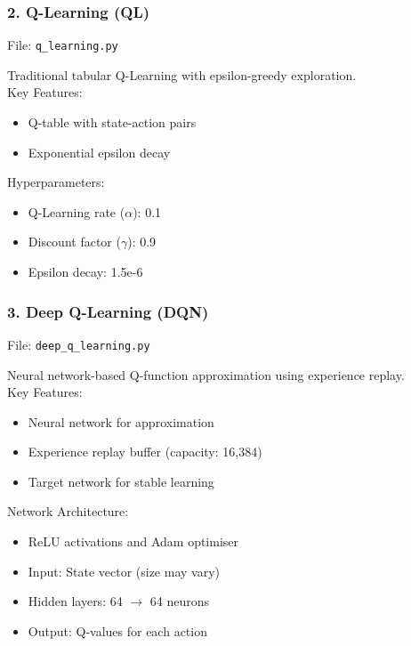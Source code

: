 \documentclass[a4paper]{report}
\begin{document}
\subsubsection{2. Q-Learning (QL)}

File: \texttt{q\_learning.py}

\noindent
Traditional tabular Q-Learning with epsilon-greedy exploration.
\\

\noindent
Key Features:
\begin{itemize}
    \item Q-table with state-action pairs
    \item Exponential epsilon decay
\end{itemize}

\noindent
Hyperparameters:
\begin{itemize}
    \item Q-Learning rate ($\alpha$): 0.1
    \item Discount factor ($\gamma$): 0.9
    \item Epsilon decay: 1.5e-6
\end{itemize}

\subsubsection{3. Deep Q-Learning (DQN)}

File: \texttt{deep\_q\_learning.py}

\noindent
Neural network-based Q-function approximation using experience replay.
\\

\noindent
Key Features:
\begin{itemize}
    \item Neural network for approximation
    \item Experience replay buffer (capacity: 16,384)
    \item Target network for stable learning
\end{itemize}

\noindent
Network Architecture:
\begin{itemize}
    \item ReLU activations and Adam optimiser
    \item Input: State vector (size may vary)
    \item Hidden layers: 64 $\to$ 64 neurons
    \item Output: Q-values for each action
\end{itemize}
\end{document}
